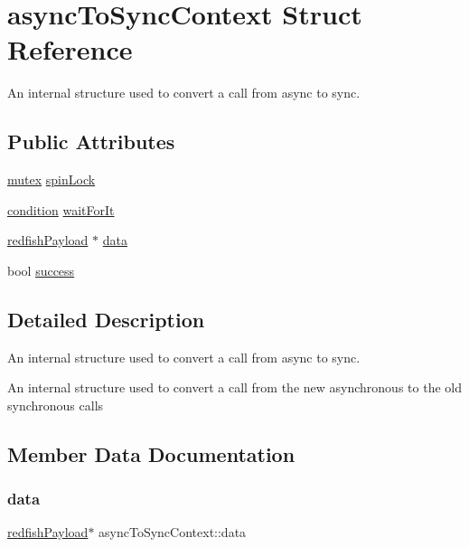\hypertarget{structasyncToSyncContext}{}\section{async\+To\+Sync\+Context Struct Reference}
\label{structasyncToSyncContext}


An internal structure used to convert a call from async to sync.  


\subsection*{Public Attributes}
\begin{DoxyCompactItemize}
\item 
\hyperlink{queue_8h_a8c80af1d72030a9dc70c3a2c3e46ae9a}{mutex} \hyperlink{structasyncToSyncContext_aa6966a3a59c87af9a5daa94ce34e07dd}{spin\+Lock}
\item 
\hyperlink{queue_8h_a18a0de1af5a8524b75bf94d6b14701b4}{condition} \hyperlink{structasyncToSyncContext_a6c09d06e275e2063e31bd9b79fa0c221}{wait\+For\+It}
\item 
\hyperlink{structredfishPayload}{redfish\+Payload} $\ast$ \hyperlink{structasyncToSyncContext_a3b287cb6b52522f115db6dccc600a8f9}{data}
\item 
bool \hyperlink{structasyncToSyncContext_a3629d45e7c35e218a5b98cfafde25b44}{success}
\end{DoxyCompactItemize}


\subsection{Detailed Description}
An internal structure used to convert a call from async to sync. 

An internal structure used to convert a call from the new asynchronous to the old synchronous calls 

\subsection{Member Data Documentation}
\mbox{\label{structasyncToSyncContext_a3b287cb6b52522f115db6dccc600a8f9}} 
\subsubsection{\texorpdfstring{data}{data}}
{\footnotesize\ttfamily \hyperlink{structredfishPayload}{redfish\+Payload}$\ast$ async\+To\+Sync\+Context\+::data}


